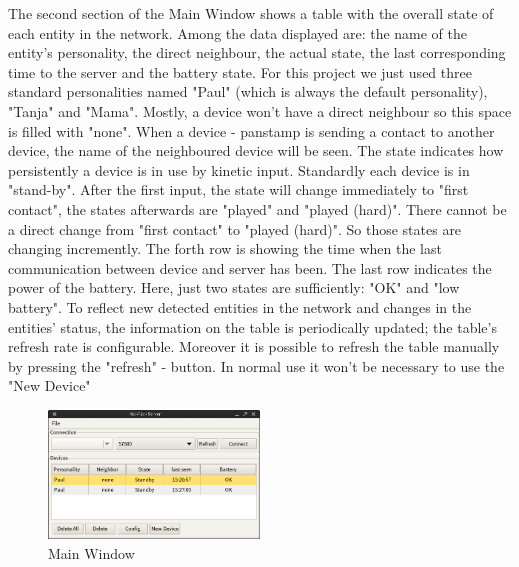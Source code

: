 The second section of the Main Window shows a table with the overall state of each entity in the network.
Among the data displayed are: the name of the entity's personality, the direct neighbour, the actual state, the last corresponding time to the server and the battery state. \newline
For this project we just used three standard personalities named "Paul" (which is always the default personality), "Tanja" and "Mama".\newline
Mostly, a device won't have a direct neighbour so this space is filled with "none". When a device - panstamp is sending a contact to another device, the name of the neighboured device will be seen. \newline
The state indicates how persistently a device is in use by kinetic input.\newline
Standardly each device is in "stand-by". After the first input, the state will change immediately to "first contact", the states afterwards are "played" and "played (hard)". There cannot be a direct change from "first contact" to "played (hard)". So those states are changing incremently.
The forth row is showing the time when the last communication between device and server has been.\newline
The last row indicates the power of the battery. Here, just two states are sufficiently: "OK" and "low battery".\newline
\newline
To reflect new detected entities in the network and changes in the entities' status, the information on the table is periodically updated; the table's refresh rate is configurable. 
Moreover it is possible to refresh the table manually by pressing the "refresh" - button.\newline
In normal use it won't be necessary to use the "New Device"
\begin{figure}[h!]
 \centering
 \includegraphics[width= 0.5\textwidth, clip=true  ,keepaspectratio=true]{./pic/java-server-main.png}
 \caption{Main Window}
 \label{java-server-main}
\end{figure}


